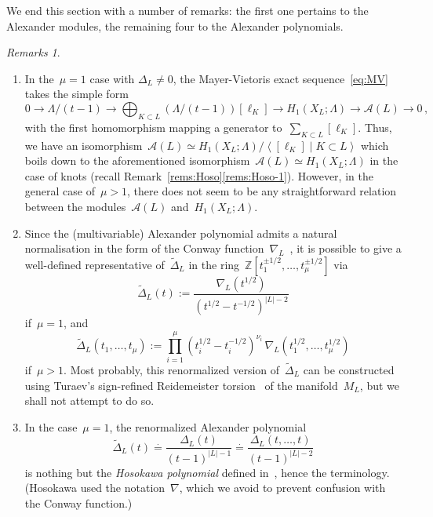 \documentclass{amsart}
\newcommand{\Z}{\mathbb{Z}}
\newcommand{\A}{\mathcal{A}}
\DeclareMathOperator{\lk}{lk}
\newcommand{\de}{\stackrel{\cdot}{=}}
\theoremstyle{definition}
\theoremstyle{remark}
\newtheorem{rems}[thm]{Remarks}
\begin{document}
	
	
	We end this section with a number of remarks: the first one pertains to the Alexander modules,
	the remaining four to the Alexander polynomials.
	
	\begin{rems}
	\label{rems:prop}
	\begin{enumerate}
	\item\label{rems:prop-1} In the~$\mu=1$ case with $\Delta_L \neq 0$, the Mayer-Vietoris exact sequence~\eqref{eq:MV} takes the simple form
	\[
	0\longrightarrow\Lambda/(t-1)\longrightarrow\bigoplus_{K\subset L}\left(\Lambda/(t-1)\right)[\ell_K]\longrightarrow H_1(X_L;\Lambda)\longrightarrow\A(L)\longrightarrow 0\,,
	\]
	with the first homomorphism mapping a generator to~$\sum_{K\subset L}[\ell_K]$.
	Thus, we have an isomorphism~$\A(L)\simeq H_1(X_L;\Lambda)/\left<[\ell_K]\mid K\subset L\right>$
	which boils down to the aforementioned isomorphism~$\A(L)\simeq H_1(X_L;\Lambda)$ in the case of knots (recall Remark~\ref{rems:Hoso}\ref{rems:Hoso-1}).
	However, in the general case of~$\mu>1$, there does not seem to be any straightforward relation between the modules~$\A(L)$ and~$H_1(X_L;\Lambda)$.
		
		\item Since the (multivariable) Alexander polynomial admits a natural normalisation in the form of the Conway function~$\nabla_L$~\cite{Con67,Har}, it is possible to give a well-defined representative of~$\widetilde\Delta_L$
	in the ring~$\Z[t_1^{\pm 1/2},\dots,t_\mu^{\pm 1/2}]$ via
	\[
	\widetilde\Delta_L(t):=\frac{\nabla_L(t^{1/2})}{(t^{1/2}-t^{-1/2})^{|L|-2}}
	\]
	if~$\mu=1$, and
	\[
	\widetilde\Delta_L(t_1,\dots,t_\mu):=\prod_{i=1}^\mu (t_i^{1/2}-t_i^{-1/2})^{\nu_i}\,\nabla_L(t_1^{1/2},\dots,t_\mu^{1/2})
	\]
	if~$\mu>1$. Most probably, this renormalized version of~$\widetilde\Delta_L$ can be constructed using
	Turaev's sign-refined Reidemeister torsion~\cite{Tur86} of the manifold~$M_L$, but we shall not attempt to do so. 
	

	\item In the case~$\mu=1$, the renormalized Alexander polynomial
	\[
	\widetilde\Delta_L(t)\stackrel{\cdot}{=}\frac{\Delta_L(t)}{(t-1)^{|L|-1}}\de\frac{\Delta_L(t,\dots,t)}{(t-1)^{|L|-2}}
	\]
	is nothing but the {\em Hosokawa polynomial\/} defined in~\cite{Hos}, hence the terminology. (Hosokawa
	used the notation~$\nabla$, which we avoid to prevent confusion with the Conway function.)


\end{enumerate}
\end{rems}
\end{document}

